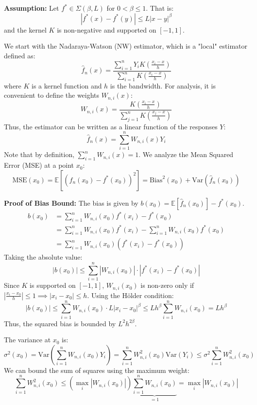 \textbf{Assumption:} Let $f^* \in \Sigma(\beta, L)$ for $0 < \beta \le 1$. That is:
$$ |f^*(x) - f^*(y)| \le L |x - y|^\beta $$
and the kernel $K$ is non-negative and supported on $[-1, 1]$.

We start with the Nadaraya-Watson (NW) estimator, which is a "local" estimator defined as:
$$ \hat{f}_n(x) = \frac{\sum_{i=1}^n Y_i K\left( \frac{x_i - x}{h} \right)}{\sum_{i=1}^n K\left( \frac{x_i - x}{h} \right)} $$
where $K$ is a kernel function and $h$ is the bandwidth. For analysis, it is convenient to define the weights $W_{n,i}(x)$:
$$ W_{n,i}(x) = \frac{K\left( \frac{x_i - x}{h} \right)}{\sum_{j=1}^n K\left( \frac{x_j - x}{h} \right)} $$
Thus, the estimator can be written as a linear function of the responses $Y$:
$$ \hat{f}_n(x) = \sum_{i=1}^n W_{n,i}(x) Y_i $$
Note that by definition, $\sum_{i=1}^n W_{n,i}(x) = 1$. We analyze the Mean Squared Error (MSE) at a point $x_0$:
$$ \text{MSE}(x_0) = \mathbb{E}[(\hat{f}_n(x_0) - f^*(x_0))^2] = \text{Bias}^2(x_0) + \text{Var}(\hat{f}_n(x_0)) $$



\textbf{Proof of Bias Bound:}
The bias is given by $b(x_0) = \mathbb{E}[\hat{f}_n(x_0)] - f^*(x_0)$.
\begin{align*}
b(x_0) &= \sum_{i=1}^n W_{n,i}(x_0) f^*(x_i) - f^*(x_0) \\
&= \sum_{i=1}^n W_{n,i}(x_0) f^*(x_i) - \sum_{i=1}^n W_{n,i}(x_0)  f^*(x_0) \\
&= \sum_{i=1}^n W_{n,i}(x_0) (f^*(x_i) - f^*(x_0))
\end{align*}
Taking the absolute value:
$$ |b(x_0)| \le \sum_{i=1}^n |W_{n,i}(x_0)| \cdot |f^*(x_i) - f^*(x_0)| $$
Since $K$ is supported on $[-1, 1]$, $W_{n,i}(x_0)$ is non-zero only if $|\frac{x_i - x_0}{h}| \le 1 \implies |x_i - x_0| \le h$. Using the Hölder condition:
$$ |b(x_0)| \le \sum_{i=1}^n W_{n,i}(x_0) \cdot L |x_i - x_0|^\beta \le L h^\beta \sum_{i=1}^n W_{n,i}(x_0) = L h^\beta $$
Thus, the squared bias is bounded by $L^2 h^{2\beta}$.

The variance at $x_0$ is:
$$ \sigma^2(x_0) = \text{Var}\left( \sum_{i=1}^n W_{n,i}(x_0) Y_i \right) = \sum_{i=1}^n W_{n,i}^2(x_0) \text{Var}(Y_i) \le \sigma^2 \sum_{i=1}^n W_{n,i}^2(x_0) $$
We can bound the sum of squares using the maximum weight:
$$ \sum_{i=1}^n W_{n,i}^2(x_0) \le \left( \max_i |W_{n,i}(x_0)| \right) \underbrace{\sum_{i=1}^n W_{n,i}(x_0)}_{=1} = \max_i |W_{n,i}(x_0)| $$

